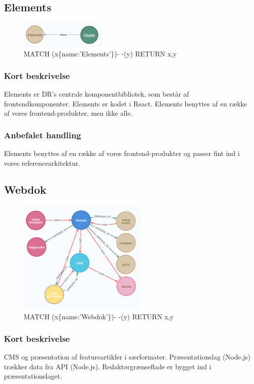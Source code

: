 \documentclass{article}
\begin{document}
\subsection{Elements}
\begin{figure}[h]
\includegraphics[width=120pt]{Elements.PNG}
\caption{MATCH (x\{name:'Elements'\})- -(y) RETURN x,y}
\end{figure}
\subsubsection*{Kort beskrivelse}
Elements er DR's centrale komponentbibliotek, som består af frontendkomponenter. Elements er kodet i React. Elements benyttes af en række af vores frontend-produkter, men ikke alle.
\subsubsection*{Anbefalet handling}
Elements benyttes af en række af vores frontend-produkter og passer fint ind i vores referencearkitektur.


\subsection{Webdok}
\begin{figure}[h]
\includegraphics[width=180pt]{Webdok.PNG}
\caption{MATCH (x\{name:'Webdok'\})- -(y) RETURN x,y}
\end{figure}
\subsubsection*{Kort beskrivelse}
CMS og præsentation af featureartikler i særformater.	
Præsentationslag (Node.js) trækker data fra API (Node.js). Redaktørgrænseflade er bygget ind i præsentationslaget.
\end{document}
